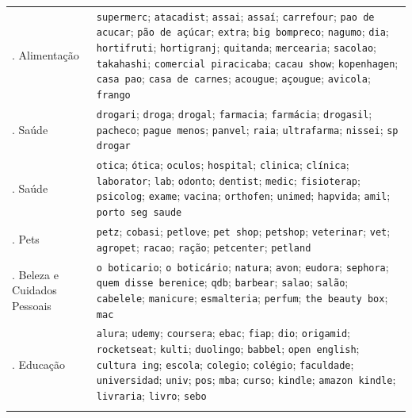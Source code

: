 \begin{apendicesenv}
\begin{longtable}{>{\raggedright\arraybackslash}p{3.1cm} >{\raggedright\arraybackslash}p{11.6cm}}
\addlinespace[2pt]
9. Alimentação & \texttt{supermerc}; \texttt{atacadist}; \texttt{assai}; \texttt{assaí}; \texttt{carrefour}; \texttt{pao de acucar}; \texttt{pão de açúcar}; \texttt{extra}; \texttt{big bompreco}; \texttt{nagumo}; \texttt{dia}; \texttt{hortifruti}; \texttt{hortigranj}; \texttt{quitanda}; \texttt{mercearia}; \texttt{sacolao}; \texttt{takahashi}; \texttt{comercial piracicaba}; \texttt{cacau show}; \texttt{kopenhagen}; \texttt{casa pao}; \texttt{casa de carnes}; \texttt{acougue}; \texttt{açougue}; \texttt{avicola}; \texttt{frango} \\
\addlinespace[2pt]
10. Saúde & \texttt{drogari}; \texttt{droga}; \texttt{drogal}; \texttt{farmacia}; \texttt{farmácia}; \texttt{drogasil}; \texttt{pacheco}; \texttt{pague menos}; \texttt{panvel}; \texttt{raia}; \texttt{ultrafarma}; \texttt{nissei}; \texttt{sp drogar} \\
\addlinespace[2pt]
11. Saúde & \texttt{otica}; \texttt{ótica}; \texttt{oculos}; \texttt{hospital}; \texttt{clinica}; \texttt{clínica}; \texttt{laborator}; \texttt{lab}; \texttt{odonto}; \texttt{dentist}; \texttt{medic}; \texttt{fisioterap}; \texttt{psicolog}; \texttt{exame}; \texttt{vacina}; \texttt{orthofen}; \texttt{unimed}; \texttt{hapvida}; \texttt{amil}; \texttt{porto seg saude} \\
\addlinespace[2pt]
12. Pets & \texttt{petz}; \texttt{cobasi}; \texttt{petlove}; \texttt{pet~shop}; \texttt{petshop}; \texttt{veterinar}; \texttt{vet}; \texttt{agropet}; \texttt{racao}; \texttt{ração}; \texttt{petcenter}; \texttt{petland} \\
\addlinespace[2pt]
13. Beleza e Cuidados Pessoais & \texttt{o~boticario}; \texttt{o~boticário}; \texttt{natura}; \texttt{avon}; \texttt{eudora}; \texttt{sephora}; \texttt{quem disse berenice}; \texttt{qdb}; \texttt{barbear}; \texttt{salao}; \texttt{salão}; \texttt{cabelele}; \texttt{manicure}; \texttt{esmalteria}; \texttt{perfum}; \texttt{the beauty box}; \texttt{mac} \\
\addlinespace[2pt]
14. Educação & \texttt{alura}; \texttt{udemy}; \texttt{coursera}; \texttt{ebac}; \texttt{fiap}; \texttt{dio}; \texttt{origamid}; \texttt{rocketseat}; \texttt{kulti}; \texttt{duolingo}; \texttt{babbel}; \texttt{open english}; \texttt{cultura ing}; \texttt{escola}; \texttt{colegio}; \texttt{colégio}; \texttt{faculdade}; \texttt{universidad}; \texttt{univ}; \texttt{pos}; \texttt{mba}; \texttt{curso}; \texttt{kindle}; \texttt{amazon kindle}; \texttt{livraria}; \texttt{livro}; \texttt{sebo} \\
\addlinespace[2pt]

\end{longtable}
\end{apendicesenv}
